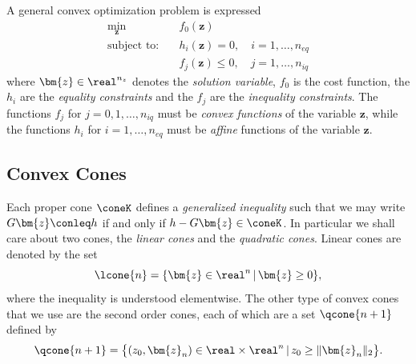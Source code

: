 \documentclass[10pt]{article}
\begin{document}
A general convex optimization problem is expressed
\begin{subequations}
\begin{align}
\min_{\bm{z}} &\quad f_0(\bm{z}) \\
\text{subject to:} &\quad h_i(\bm{z}) = 0, \quad i=1,\ldots,n_{eq} \\
&\quad f_j(\bm{z}) \leq 0, \quad j = 1,\ldots,n_{iq}
\end{align}
\end{subequations}
where $\bm{z}\in\real^{n_z}$ denotes the \textit{solution variable}, $f_0$ is the cost function, the $h_i$ are the \textit{equality constraints} and the $f_j$ are the \textit{inequality constraints}. The functions $f_j$ for $j=0,1,\ldots,n_{iq}$ must be \textit{convex functions} of the variable $\bm{z}$, while the functions $h_i$ for $i=1,\ldots,n_{eq}$ must be \textit{affine} functions of the variable $\bm{z}$.

\subsection*{Convex Cones}

Each proper cone $\coneK$ defines a \textit{generalized inequality} such that we may write $G \bm{z} \conleq h$ if and only if $h - G \bm{z} \in \coneK$. In particular we shall care about two cones, the \textit{linear cones} and the \textit{quadratic cones}. Linear cones are denoted by the set 
\begin{equation}
\lcone{n} = \{ \bm{z}\in\real^n \,|\, \bm{z} \geq 0 \},
\label{eq:lcone_set}
\end{equation}
where the inequality is understood elementwise. The other type of convex cones that we use are the second order cones, each of which are a set $\qcone{n+1}$ defined by
\begin{equation}
\qcone{n+1} = \big\{ (z_0,\bm{z}_n)\in\real\times\real^n \,|\, z_0 \geq \| \bm{z}_n \|_2 \big\}.
\label{eq:soc_set}
\end{equation}
\end{document}
